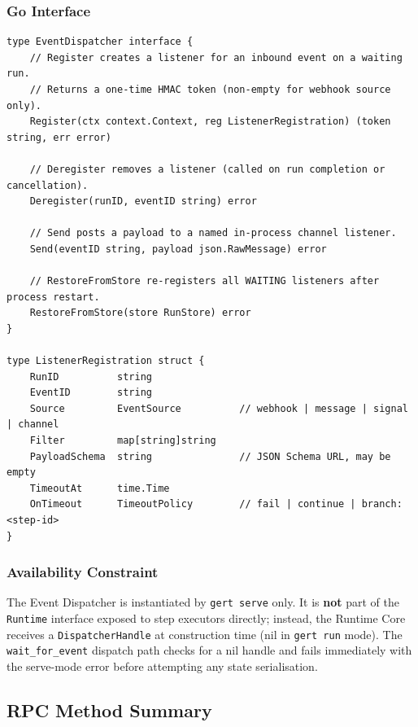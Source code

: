 \subsubsection*{Go Interface}

\begin{verbatim}
type EventDispatcher interface {
    // Register creates a listener for an inbound event on a waiting run.
    // Returns a one-time HMAC token (non-empty for webhook source only).
    Register(ctx context.Context, reg ListenerRegistration) (token string, err error)

    // Deregister removes a listener (called on run completion or cancellation).
    Deregister(runID, eventID string) error

    // Send posts a payload to a named in-process channel listener.
    Send(eventID string, payload json.RawMessage) error

    // RestoreFromStore re-registers all WAITING listeners after process restart.
    RestoreFromStore(store RunStore) error
}

type ListenerRegistration struct {
    RunID          string
    EventID        string
    Source         EventSource          // webhook | message | signal | channel
    Filter         map[string]string
    PayloadSchema  string               // JSON Schema URL, may be empty
    TimeoutAt      time.Time
    OnTimeout      TimeoutPolicy        // fail | continue | branch:<step-id>
}
\end{verbatim}

\subsubsection*{Availability Constraint}

The Event Dispatcher is instantiated by \texttt{gert serve} only. It is \textbf{not} part of
the \texttt{Runtime} interface exposed to step executors directly; instead, the Runtime Core
receives a \texttt{DispatcherHandle} at construction time (nil in \texttt{gert run} mode).
The \texttt{wait\_for\_event} dispatch path checks for a nil handle and fails immediately
with the serve-mode error before attempting any state serialisation.

\subsection{RPC Method Summary}

